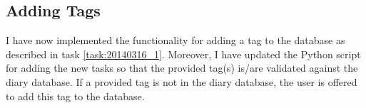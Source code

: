 \subsection{Adding Tags}
\label{task:20140323_jkn0}
I have now implemented the functionality for adding a tag to the database as described in task \ref{task:20140316_1}. Moreover, I have updated the Python script for adding the new tasks so that the provided tag(s) is/are validated against the diary database. If a provided tag is not in the diary database, the user is offered to add this tag to the database.
